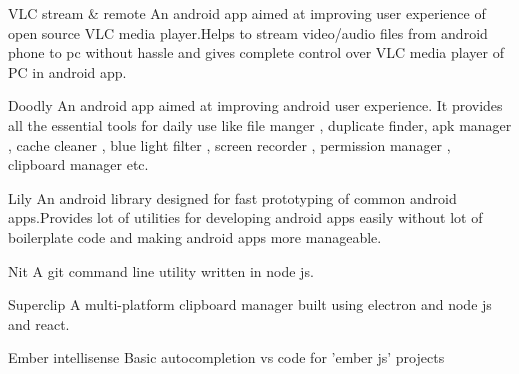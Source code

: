 
\begin{cventries}
  \cvproject
    {VLC stream \& remote} %
    {An android app aimed at improving user experience of open source VLC media player.Helps to stream video/audio files from android phone to pc without hassle and gives complete control over VLC media player of PC in android app.} %
  
  \cvproject
    {Doodly}
    {An android app aimed at improving android user experience. It provides all the essential tools for daily use like file manger , duplicate finder, apk manager , cache cleaner , blue light filter , screen recorder , permission manager , clipboard manager etc.}

  \cvproject
    {Lily}
    {An android library designed for fast prototyping of common android apps.Provides lot of utilities for developing android apps easily without lot of boilerplate code and making android apps more manageable.}

  \cvproject
    {Nit}
    {A git command line utility written in node js.}

  \cvproject
    {Superclip}
    {A multi-platform clipboard manager built using electron and node js and react.}
  
  \cvproject
    {Ember intellisense}
    {Basic autocompletion vs code for 'ember js' projects}

\end{cventries}
